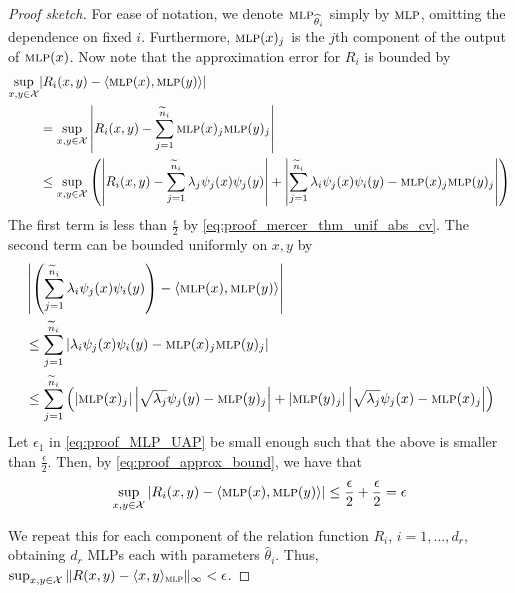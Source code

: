 \begin{proof}[Proof sketch]
	For ease of notation, we denote $\text{\sc mlp}_{\widehat{\theta}_i}$ simply by $\text{\sc mlp}$, omitting the dependence on fixed $i$. Furthermore, $\text{\sc mlp}(x)_j$ is the $j$th component of the output of $\text{\sc mlp}(x)$. Now note that the approximation error for $R_i$ is bounded by
	\begin{equation}
		\label{eq:proof_approx_bound}
		\begin{split}
			\sup_{x, y \in \mathcal{X}}&{
				\left\lvert R_i(x,y) - \langle \MLP(x), \MLP(y) \rangle \right\rvert}\\
			&= \sup_{x, y \in \mathcal{X}}{
				\left\lvert R_i(x,y) - \sum_{j=1}^{\tilde{n}_i}{\MLP(x)_j \MLP(y)_j} \right\rvert} \\
			&\leq \sup_{x,y \in \mathcal{X}}{ \left(
				\left\lvert R_i(x,y) - \sum_{j=1}^{\tilde{n}_i}{\lambda_j \psi_j(x) \psi_j(y)} \right\rvert
				+ \left\lvert \sum_{j=1}^{\tilde{n}_i}{\lambda_i \psi_j(x) \psi_i(y) - \MLP(x)_j \MLP(y)_j} \right\rvert  \right) }
		\end{split}
	\end{equation}
	The first term is less than $\frac{\epsilon}{2}$ by \eqref{eq:proof_mercer_thm_unif_abs_cv}. The second term can be bounded uniformly on $x,y$ by
	\begin{equation*}
		\begin{split}
			&\left\lvert \left(\sum_{j=1}^{\tilde{n}_i}{\lambda_i \psi_j(x) \psi_i(y)}\right) - \langle \MLP(x), \MLP(y) \rangle \right\rvert  \\
			&\leq \sum_{j=1}^{\tilde{n}_i}{ \left\lvert \lambda_i \psi_j(x) \psi_i(y) - \MLP(x)_j \MLP(y)_j \right\rvert} \\
			&\leq \sum_{j=1}^{\tilde{n}_i}{\left(
				\left\lvert \MLP(x)_j \right\rvert \left\lvert \sqrt{\lambda_j} \psi_j(y) - \MLP(y)_j \right\rvert
				+ \lvert \MLP(y)_j \rvert \left\lvert \sqrt{\lambda_j} \psi_j(x) - \MLP(x)_j \right\rvert
				\right)}
		\end{split}
	\end{equation*}
	Let $\epsilon_1$ in \eqref{eq:proof_MLP_UAP} be small enough such that the above is smaller than $\frac{\epsilon}{2}$. 	Then, by \eqref{eq:proof_approx_bound}, we have that
	\begin{equation*}
		\sup_{x, y \in \mathcal{X}}{
			\lvert R_i(x,y) - \langle \MLP(x), \MLP(y) \rangle \rvert} \leq \frac{\epsilon}{2} + \frac{\epsilon}{2} = \epsilon
	\end{equation*}

	We repeat this for each component of the relation function $R_i$, $i=1, ..., d_r$, obtaining $d_r$ MLPs each with parameters $\hat{\theta}_i$. Thus, $\sup_{x,y \in \mathcal{X}}{\lVert R(x,y) - \langle x, y \rangle_{\text{\sc mlp}} \rVert_\infty} < \epsilon$.
\end{proof}


